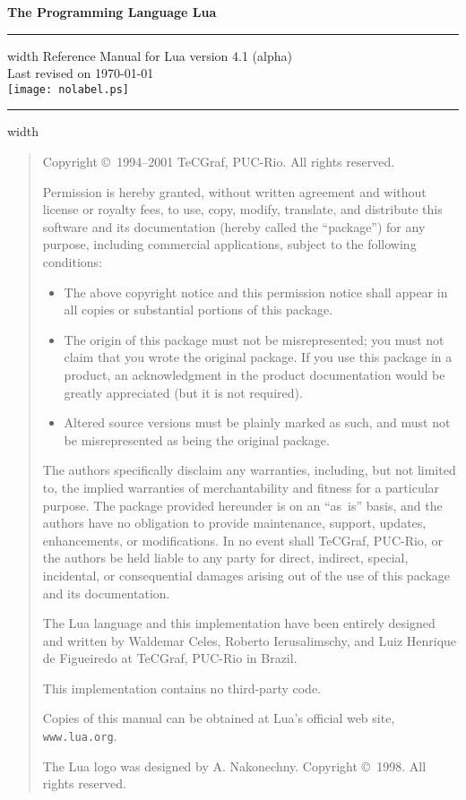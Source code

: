 \documentclass[11pt,twoside,draft]{article}
\newcommand{\Version}{4.1 (alpha)}
\begin{document}
\thispagestyle{empty}
\pagestyle{empty}

{
\parindent=0pt
{\LARGE\bf
The Programming Language Lua}
\hfill
\vskip4pt \hrule height 4pt width \hsize \vskip4pt
\hfill
Reference Manual for Lua version \Version
\\
\null
\hfill
Last revised on \today
\\
\vfill
\centering
\texttt{[image: nolabel.ps]}
\vfill
\vskip4pt \hrule height 2pt width \hsize
}

\newpage
\begin{quotation}
\parskip=10pt
\parindent=0pt
\footnotesize
\null\vfill

\noindent
Copyright \copyright\ 1994--2001 TeCGraf, PUC-Rio.  All rights reserved.

Permission is hereby granted, without written agreement and without license
or royalty fees, to use, copy, modify, translate, and distribute
this software and its documentation (hereby called the ``package'')
for any purpose, including commercial applications, subject to
the following conditions:
\begin{itemize}
\item The above copyright notice and this permission notice shall appear in all
   copies or substantial portions of this package.

\item The origin of this package must not be misrepresented; you must not
   claim that you wrote the original package. If you use this package in a
   product, an acknowledgment in the product documentation would be greatly
   appreciated (but it is not required).

\item Altered source versions must be plainly marked as such, and must not be
   misrepresented as being the original package.
\end{itemize}
The authors specifically disclaim any warranties, including, but not limited
to, the implied warranties of merchantability and fitness for a particular
purpose.  The package provided hereunder is on an ``as~is'' basis, and the
authors have no obligation to provide maintenance, support, updates,
enhancements, or modifications.  In no event shall TeCGraf, PUC-Rio, or the
authors be held liable to any party for direct, indirect, special,
incidental, or consequential damages arising out of the use of this package
and its documentation.

The Lua language and this implementation have been entirely designed and
written by Waldemar Celes, Roberto Ierusalimschy, and Luiz Henrique de
Figueiredo at TeCGraf, PUC-Rio in Brazil.

This implementation contains no third-party code.

Copies of this manual can be obtained at
Lua's official web site,
\verb|www.lua.org|.

\bigskip
The Lua logo was designed by A. Nakonechny.
Copyright \copyright\ 1998.  All rights reserved.
\end{quotation}
\newpage
\end{document}
